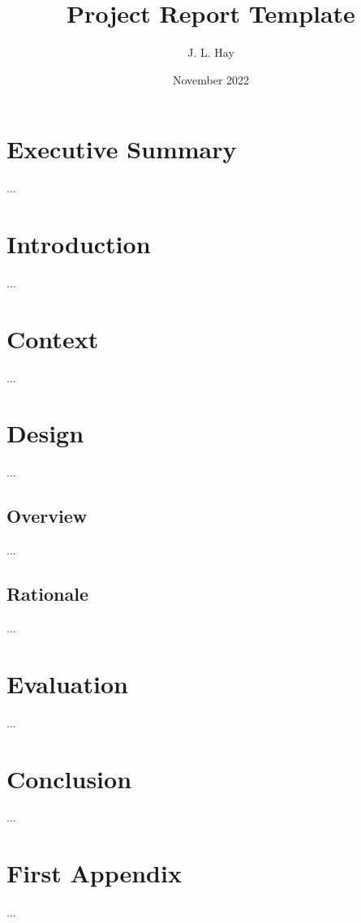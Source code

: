 \documentclass{article}
\title{Project Report Template}
\author{J. L. Hay \cite{hay22}}
\date{November 2022}
\begin{document}
\thispagestyle{empty}

\maketitle

\pagebreak



\section*{Executive Summary}
...

\pagebreak


\tableofcontents

\pagebreak


\fancyfoot[R]{\thepage/\pageref*{page:final}}

\section{Introduction}
...

\pagebreak


\section{Context}
...

\pagebreak


\section{Design}
...

\subsection{Overview}
...

\subsection{Rationale}
... 

\pagebreak


\section{Evaluation}
...

\pagebreak


\section*{Conclusion}
\label{page:final}
...

\pagebreak


\fancyfoot[R]{\thepage}

\printbibliography
{}

\pagebreak
\appendix

\section*{First Appendix}
...
\end{document}
